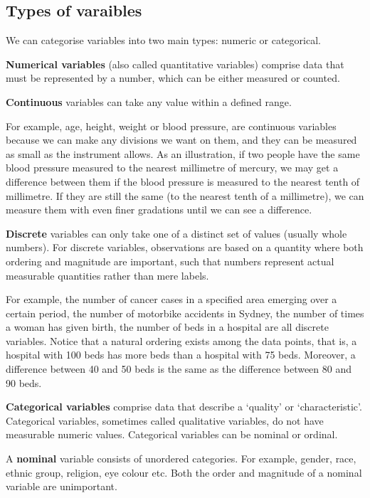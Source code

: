 \documentclass[
  a4paper,
]{memoir}
\begin{document}
\hypertarget{types-of-varaibles}{%
\subsection{Types of varaibles}\label{types-of-varaibles}}

We can categorise variables into two main types: numeric or categorical.

\textbf{Numerical variables} (also called quantitative variables)
comprise data that must be represented by a number, which can be either
measured or counted.

\textbf{Continuous} variables can take any value within a defined range.

For example, age, height, weight or blood pressure, are continuous
variables because we can make any divisions we want on them, and they
can be measured as small as the instrument allows. As an illustration,
if two people have the same blood pressure measured to the nearest
millimetre of mercury, we may get a difference between them if the blood
pressure is measured to the nearest tenth of millimetre. If they are
still the same (to the nearest tenth of a millimetre), we can measure
them with even finer gradations until we can see a difference.

\textbf{Discrete} variables can only take one of a distinct set of
values (usually whole numbers). For discrete variables, observations are
based on a quantity where both ordering and magnitude are important,
such that numbers represent actual measurable quantities rather than
mere labels.

For example, the number of cancer cases in a specified area emerging
over a certain period, the number of motorbike accidents in Sydney, the
number of times a woman has given birth, the number of beds in a
hospital are all discrete variables. Notice that a natural ordering
exists among the data points, that is, a hospital with 100 beds has more
beds than a hospital with 75 beds. Moreover, a difference between 40 and
50 beds is the same as the difference between 80 and 90 beds.

\textbf{Categorical variables} comprise data that describe a `quality'
or `characteristic'. Categorical variables, sometimes called qualitative
variables, do not have measurable numeric values. Categorical variables
can be nominal or ordinal.

A \textbf{nominal} variable consists of unordered categories. For
example, gender, race, ethnic group, religion, eye colour etc. Both the
order and magnitude of a nominal variable are unimportant.
\end{document}
